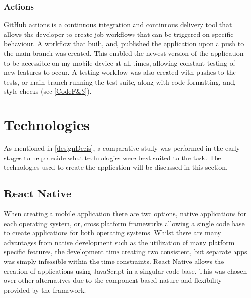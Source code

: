 \subsubsection{Actions}\label{ghActions}
GitHub actions is a continuous integration and continuous delivery tool that allows the developer to create job workflows that can be triggered on specific behaviour. A workflow that built, and, published the application upon a push to the main branch was created. This enabled the newest version of the application to be accessible on my mobile device at all times, allowing constant testing of new features to occur. A testing workflow was also created with pushes to the tests, or main branch running the test suite, along with code formatting, and, style checks (see \ref{CodeF&S}).
\section{Technologies}
As mentioned in \ref{designDecis}, a comparative study \cite{compStudy} was performed in the early stages to help decide what technologies were best suited to the task. The technologies used to create the application will be discussed in this section.
\subsection{React Native}\label{reactSection}
When creating a mobile application there are two options, native applications for each operating system, or, cross platform frameworks allowing a single code base to create applications for both operating systems. Whilst there are many advantages from native development such as the utilization of many platform specific features, the development time creating two consistent, but separate apps was simply infeasible within the time constraints. React Native \cite{reactnative} allows the creation of applications using JavaScript \cite{js} in a singular code base. This was chosen over other alternatives due to the component based nature and flexibility provided by the framework.
